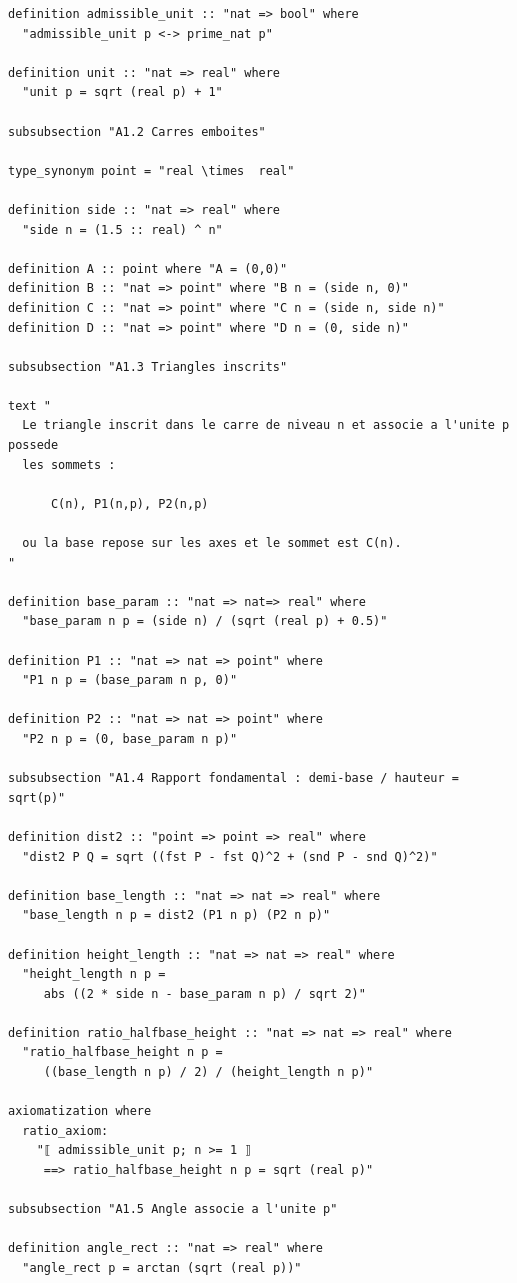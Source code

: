 \documentclass[12pt,a4paper]{article}
\begin{document}
\begin{verbatim}
definition admissible_unit :: "nat => bool" where
  "admissible_unit p <-> prime_nat p"

definition unit :: "nat => real" where
  "unit p = sqrt (real p) + 1"

subsubsection "A1.2 Carres emboites"

type_synonym point = "real \times  real"

definition side :: "nat => real" where
  "side n = (1.5 :: real) ^ n"

definition A :: point where "A = (0,0)"
definition B :: "nat => point" where "B n = (side n, 0)"
definition C :: "nat => point" where "C n = (side n, side n)"
definition D :: "nat => point" where "D n = (0, side n)"

subsubsection "A1.3 Triangles inscrits"

text "
  Le triangle inscrit dans le carre de niveau n et associe a l'unite p possede
  les sommets :

      C(n), P1(n,p), P2(n,p)

  ou la base repose sur les axes et le sommet est C(n).
"

definition base_param :: "nat => nat=> real" where
  "base_param n p = (side n) / (sqrt (real p) + 0.5)"

definition P1 :: "nat => nat => point" where
  "P1 n p = (base_param n p, 0)"

definition P2 :: "nat => nat => point" where
  "P2 n p = (0, base_param n p)"

subsubsection "A1.4 Rapport fondamental : demi-base / hauteur = sqrt(p)"

definition dist2 :: "point => point => real" where
  "dist2 P Q = sqrt ((fst P - fst Q)^2 + (snd P - snd Q)^2)"

definition base_length :: "nat => nat => real" where
  "base_length n p = dist2 (P1 n p) (P2 n p)"

definition height_length :: "nat => nat => real" where
  "height_length n p =
     abs ((2 * side n - base_param n p) / sqrt 2)"

definition ratio_halfbase_height :: "nat => nat => real" where
  "ratio_halfbase_height n p =
     ((base_length n p) / 2) / (height_length n p)"

axiomatization where
  ratio_axiom:
    "⟦ admissible_unit p; n >= 1 ⟧
     ==> ratio_halfbase_height n p = sqrt (real p)"

subsubsection "A1.5 Angle associe a l'unite p"

definition angle_rect :: "nat => real" where
  "angle_rect p = arctan (sqrt (real p))"


\end{verbatim}
\end{document}
